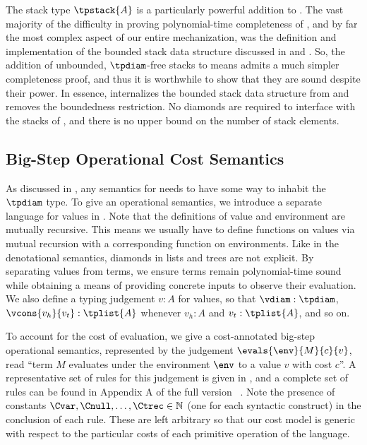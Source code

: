 


\enlargethispage{\baselineskip}
The stack type $\tpstack{A}$ is a particularly powerful addition to \lfpl. The vast majority of the difficulty in proving polynomial-time completeness of \lfpl, and by far the most complex aspect of our entire mechanization, was the definition and implementation of the bounded stack data structure discussed in  and . So, the addition of unbounded, $\tpdiam$-free stacks to \lfpl means \lfplplus admits a much simpler completeness proof, and thus it is worthwhile to show that they are sound despite their power. In essence, \lfplplus internalizes the bounded stack data structure from  and removes the boundedness restriction. No diamonds are required to interface with the stacks of \lfplplus, and there is no upper bound on the number of stack elements.



\subsection{Big-Step Operational Cost Semantics}
\label{sec:operational-semantics}

As discussed in , any semantics for \lfplplus needs to have some way to inhabit the $\tpdiam$ type. To give \lfplplus an operational semantics, we introduce a separate language for \lfplplus values in . Note that the definitions of value and environment are mutually recursive. This means we usually have to define functions on values via mutual recursion with a corresponding function on environments. Like in the denotational semantics, diamonds in lists and trees are not explicit.
%
By separating values from terms, we ensure \lfplplus terms remain polynomial-time sound while obtaining a means of providing concrete inputs to observe their evaluation. We also define a typing judgement $v : A$ for values, so that $\vdiam : \tpdiam$, $\vcons{v_h}{v_t} : \tplist{A}$ whenever $v_h : A$ and $v_t : \tplist{A}$, and so on.




To account for the cost of evaluation, we give a cost-annotated big-step operational semantics, represented by the judgement $\evals{\env}{M}{c}{v}$, read ``term $M$ evaluates under the environment $\env$ to a value $v$ with cost $c$''. A representative set of rules for this judgement is given in , and a complete set of rules can be found in{
  \ifdefined\FULLVERSION
  \else
    Appendix A of the full version~\cite{fullversion}%
  \fi
}. Note the presence of constants $\Cvar, \Cnull, \ldots, \Ctrec \in \mathbb N$ (one for each syntactic construct) in the conclusion of each rule. These are left arbitrary so that our cost model is generic with respect to the particular costs of each primitive operation of the language.

